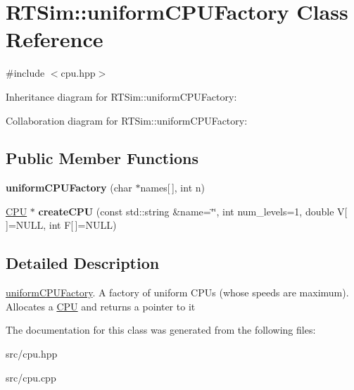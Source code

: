 \hypertarget{classRTSim_1_1uniformCPUFactory}{}\section{R\+T\+Sim\+:\+:uniform\+C\+P\+U\+Factory Class Reference}
\label{classRTSim_1_1uniformCPUFactory}


{\ttfamily \#include $<$cpu.\+hpp$>$}



Inheritance diagram for R\+T\+Sim\+:\+:uniform\+C\+P\+U\+Factory\+:


Collaboration diagram for R\+T\+Sim\+:\+:uniform\+C\+P\+U\+Factory\+:
\subsection*{Public Member Functions}
\begin{DoxyCompactItemize}
\item 
{\bfseries uniform\+C\+P\+U\+Factory} (char $\ast$names\mbox{[}$\,$\mbox{]}, int n)\hypertarget{classRTSim_1_1uniformCPUFactory_a1002eef115e19f71e95b148b1f20026c}{}\label{classRTSim_1_1uniformCPUFactory_a1002eef115e19f71e95b148b1f20026c}

\item 
\hyperlink{classRTSim_1_1CPU}{C\+PU} $\ast$ {\bfseries create\+C\+PU} (const std\+::string \&name=\char`\"{}\char`\"{}, int num\+\_\+levels=1, double V\mbox{[}$\,$\mbox{]}=N\+U\+LL, int F\mbox{[}$\,$\mbox{]}=N\+U\+LL)\hypertarget{classRTSim_1_1uniformCPUFactory_ac9f1d8ccad3a529023961c4b3c30f2db}{}\label{classRTSim_1_1uniformCPUFactory_ac9f1d8ccad3a529023961c4b3c30f2db}

\end{DoxyCompactItemize}


\subsection{Detailed Description}
\hyperlink{classRTSim_1_1uniformCPUFactory}{uniform\+C\+P\+U\+Factory}. A factory of uniform C\+P\+Us (whose speeds are maximum). Allocates a \hyperlink{classRTSim_1_1CPU}{C\+PU} and returns a pointer to it 

The documentation for this class was generated from the following files\+:\begin{DoxyCompactItemize}
\item 
src/cpu.\+hpp\item 
src/cpu.\+cpp\end{DoxyCompactItemize}
